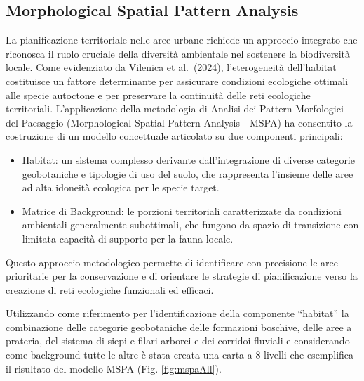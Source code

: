 \documentclass[
  a4paper,
]{book}
\begin{document}
\subsection{Morphological Spatial Pattern Analysis}\label{morphological-spatial-pattern-analysis-1}

La pianificazione territoriale nelle aree urbane richiede un approccio integrato che riconosca il ruolo cruciale della diversità ambientale nel sostenere la biodiversità locale.
Come evidenziato da Vilenica et al.~(2024), l'eterogeneità dell'habitat costituisce un fattore determinante per assicurare condizioni ecologiche ottimali alle specie autoctone e per preservare la continuità delle reti ecologiche territoriali.
L'applicazione della metodologia di Analisi dei Pattern Morfologici del Paesaggio (Morphological Spatial Pattern Analysis - MSPA) ha consentito la costruzione di un modello concettuale articolato su due componenti principali:

\begin{itemize}
\item
  Habitat: un sistema complesso derivante dall'integrazione di diverse categorie geobotaniche e tipologie di uso del suolo, che rappresenta l'insieme delle aree ad alta idoneità ecologica per le specie target.
\item
  Matrice di Background: le porzioni territoriali caratterizzate da condizioni ambientali generalmente subottimali, che fungono da spazio di transizione con limitata capacità di supporto per la fauna locale.
\end{itemize}

Questo approccio metodologico permette di identificare con precisione le aree prioritarie per la conservazione e di orientare le strategie di pianificazione verso la creazione di reti ecologiche funzionali ed efficaci.

Utilizzando come riferimento per l'identificazione della componente ``habitat'' la combinazione delle categorie geobotaniche delle formazioni boschive, delle aree a prateria, del sistema di siepi e filari arborei e dei corridoi fluviali e considerando come background tutte le altre è stata creata una carta a 8 livelli che esemplifica il risultato del modello MSPA (Fig. \ref{fig:mspaAll}).
\end{document}
